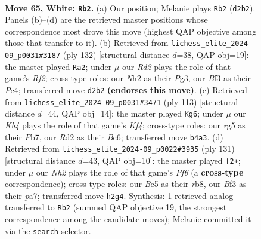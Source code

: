 \documentclass[11pt]{article}
\begin{document}
\clearpage

\begin{figure}[p]\centering
\begin{subfigure}{0.46\textwidth}\centering
\resizebox{\linewidth}{!}{%
\newchessgame
\chessboard[
  setfen={2k5/8/4b3/2B3r1/PK6/1P3B1p/3R3N/8 w - - 8 65},
  showmover=false,
  pgfstyle=straightmove, color=movearrow, markmove={d2-b2}
]}
\caption{}
\end{subfigure}\hfill
\begin{subfigure}{0.46\textwidth}\centering
\resizebox{\linewidth}{!}{%
\newchessgame
\chessboard[
  setfen={8/8/4k3/7p/2PK2b1/1r2B1P1/5R2/8 w - - 23 67},
  showmover=false,
  pgfstyle=straightmove, color=movearrow, markmove={f2-a2}
]}
\caption{}
\end{subfigure}
\\[4pt]
\begin{subfigure}{0.46\textwidth}\centering
\resizebox{\linewidth}{!}{%
\newchessgame
\chessboard[
  setfen={8/1p6/2b2p2/P4k2/1P3p2/2B5/5K2/8 b - - 2 57},
  showmover=false,
  pgfstyle=straightmove, color=movearrow, markmove={f5-g6}
]}
\caption{}
\end{subfigure}\hfill
\begin{subfigure}{0.46\textwidth}\centering
\resizebox{\linewidth}{!}{%
\newchessgame
\chessboard[
  setfen={1R2r3/P7/8/8/2PBn3/5pk1/P7/6K1 b - - 8 66},
  showmover=false,
  pgfstyle=straightmove, color=movearrow, markmove={f3-f2}
]}
\caption{}
\end{subfigure}
\caption{\textbf{Move 65, White: \texttt{Rb2}.} (a) Our position; Melanie plays \texttt{Rb2} (\texttt{d2b2}). Panels (b)--(d) are the retrieved master positions whose correspondence most drove this move (highest QAP objective among those that transfer to it). (b) Retrieved from \texttt{lichess\_elite\_2024-09\_p0031\#3187} (ply 132) [structural distance $d$=38, QAP obj=19]: the master played \texttt{Ra2}; under $\mu$ our \emph{Rd2} plays the role of that game's \emph{Rf2}; cross-type roles: our \emph{N}h2 as their \emph{P}g3, our \emph{B}f3 as their \emph{P}c4; transferred move \texttt{d2b2} \textbf{(endorses this move)}. (c) Retrieved from \texttt{lichess\_elite\_2024-09\_p0031\#3471} (ply 113) [structural distance $d$=44, QAP obj=14]: the master played \texttt{Kg6}; under $\mu$ our \emph{Kb4} plays the role of that game's \emph{Kf4}; cross-type roles: our \emph{r}g5 as their \emph{P}b7, our \emph{R}d2 as their \emph{B}c6; transferred move \texttt{b4a3}. (d) Retrieved from \texttt{lichess\_elite\_2024-09\_p0022\#3935} (ply 131) [structural distance $d$=43, QAP obj=10]: the master played \texttt{f2+}; under $\mu$ our \emph{Nh2} plays the role of that game's \emph{Pf6} (a \textbf{cross-type} correspondence); cross-type roles: our \emph{B}c5 as their \emph{r}b8, our \emph{B}f3 as their \emph{p}a7; transferred move \texttt{h2g4}. Synthesis: 1 retrieved analog transferred to \texttt{Rb2} (summed QAP objective 19, the strongest correspondence among the candidate moves); Melanie committed it via the \texttt{search} selector.}
\label{fig:thought-m128}
\end{figure}
\end{document}
